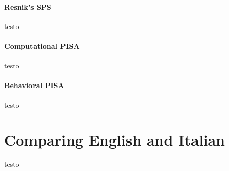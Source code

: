 \paragraph{Resnik's SPS} testo

\paragraph{Computational PISA} testo

\paragraph{Behavioral PISA} testo



\section{Comparing English and Italian} 

testo










